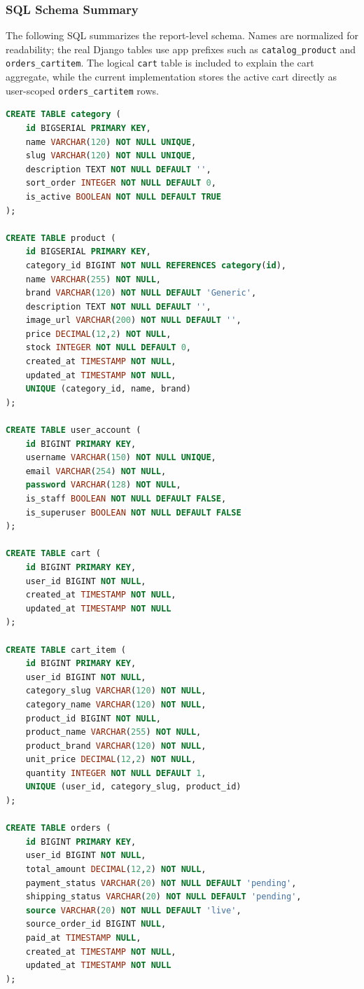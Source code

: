 \documentclass[12pt,a4paper]{article}
\newcommand{\codepath}[1]{{\small\texttt{#1}}}
\begin{document}
\subsubsection{SQL Schema Summary}

The following SQL summarizes the report-level schema. Names are normalized for readability; the real Django tables use app prefixes such as \codepath{catalog\_product} and \codepath{orders\_cartitem}. The logical \codepath{cart} table is included to explain the cart aggregate, while the current implementation stores the active cart directly as user-scoped \codepath{orders\_cartitem} rows.

\begin{lstlisting}[language=SQL,caption={Database schema summary for the e-commerce system.}]
CREATE TABLE category (
    id BIGSERIAL PRIMARY KEY,
    name VARCHAR(120) NOT NULL UNIQUE,
    slug VARCHAR(120) NOT NULL UNIQUE,
    description TEXT NOT NULL DEFAULT '',
    sort_order INTEGER NOT NULL DEFAULT 0,
    is_active BOOLEAN NOT NULL DEFAULT TRUE
);

CREATE TABLE product (
    id BIGSERIAL PRIMARY KEY,
    category_id BIGINT NOT NULL REFERENCES category(id),
    name VARCHAR(255) NOT NULL,
    brand VARCHAR(120) NOT NULL DEFAULT 'Generic',
    description TEXT NOT NULL DEFAULT '',
    image_url VARCHAR(200) NOT NULL DEFAULT '',
    price DECIMAL(12,2) NOT NULL,
    stock INTEGER NOT NULL DEFAULT 0,
    created_at TIMESTAMP NOT NULL,
    updated_at TIMESTAMP NOT NULL,
    UNIQUE (category_id, name, brand)
);

CREATE TABLE user_account (
    id BIGINT PRIMARY KEY,
    username VARCHAR(150) NOT NULL UNIQUE,
    email VARCHAR(254) NOT NULL,
    password VARCHAR(128) NOT NULL,
    is_staff BOOLEAN NOT NULL DEFAULT FALSE,
    is_superuser BOOLEAN NOT NULL DEFAULT FALSE
);

CREATE TABLE cart (
    id BIGINT PRIMARY KEY,
    user_id BIGINT NOT NULL,
    created_at TIMESTAMP NOT NULL,
    updated_at TIMESTAMP NOT NULL
);

CREATE TABLE cart_item (
    id BIGINT PRIMARY KEY,
    user_id BIGINT NOT NULL,
    category_slug VARCHAR(120) NOT NULL,
    category_name VARCHAR(120) NOT NULL,
    product_id BIGINT NOT NULL,
    product_name VARCHAR(255) NOT NULL,
    product_brand VARCHAR(120) NOT NULL,
    unit_price DECIMAL(12,2) NOT NULL,
    quantity INTEGER NOT NULL DEFAULT 1,
    UNIQUE (user_id, category_slug, product_id)
);

CREATE TABLE orders (
    id BIGINT PRIMARY KEY,
    user_id BIGINT NOT NULL,
    total_amount DECIMAL(12,2) NOT NULL,
    payment_status VARCHAR(20) NOT NULL DEFAULT 'pending',
    shipping_status VARCHAR(20) NOT NULL DEFAULT 'pending',
    source VARCHAR(20) NOT NULL DEFAULT 'live',
    source_order_id BIGINT NULL,
    paid_at TIMESTAMP NULL,
    created_at TIMESTAMP NOT NULL,
    updated_at TIMESTAMP NOT NULL
);


\end{lstlisting}
\end{document}
